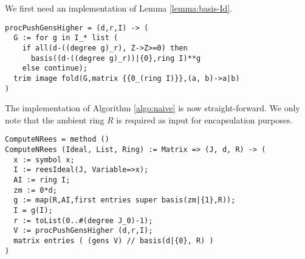 \documentclass[fleqn,reqno]{amsart}
\numberwithin{first}{chapter}
\begin{document}
\begin{implementation}
We first need an implementation of Lemma \ref{lemma:basis-Id}.
\label{code:lemma:basis-Id}
\begin{verbatim}
procPushGensHigher = (d,r,I) -> (
  G := for g in I_* list (
    if all(d-((degree g)_r), Z->Z>=0) then
      basis((d-((degree g)_r))|{0},ring I)**g
    else continue);
  trim image fold(G,matrix {{0_(ring I)}},(a, b)->a|b)
)
\end{verbatim}
\end{implementation}

\begin{implementation}
\label{code:algo:naive}
The implementation of Algorithm \ref{algo:naive} is now straight-forward.
We only note that the ambient ring $R$ is required as input for encapsulation purposes.
\begin{verbatim}
ComputeNRees = method ()
ComputeNRees (Ideal, List, Ring) := Matrix => (J, d, R) -> (
  x := symbol x;
  I := reesIdeal(J, Variable=>x);
  AI := ring I;
  zm := 0*d;
  g := map(R,AI,first entries super basis(zm|{1},R));
  I = g(I);
  r := toList(0..#(degree J_0)-1);
  V := procPushGensHigher (d,r,I);
  matrix entries ( (gens V) // basis(d|{0}, R) )
)
\end{verbatim}
\end{implementation}
\end{document}
